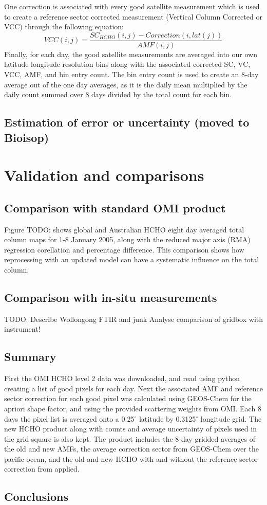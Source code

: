     One correction is associated with every good satellite measurement which is used to create a reference sector corrected measurement (Vertical Column Corrected or VCC) through the following equation:
    \begin{equation}
      VCC(i,j) = \frac{SC_{HCHO}(i,j) - Correction(i,lat(j))}{AMF(i,j)}
    \end{equation}
    Finally, for each day, the good satellite measurements are averaged into our own latitude longitude resolution bins along with the associated corrected SC, VC, VCC, AMF, and bin entry count.
    The bin entry count is used to create an 8-day average out of the one day averages, as it is the daily mean multiplied by the daily count summed over 8 days divided by the total count for each bin.
    
  \subsection{Estimation of error or uncertainty (moved to Bioisop)}
    
  
\section{Validation and comparisons}
  \label{ch_HCHO:sec:Validation}
  
  \subsection{Comparison with standard OMI product}
    Figure TODO: shows global and Australian HCHO eight day averaged total column maps for 1-8 January 2005, along with the reduced major axis (RMA) regression corellation and percentage difference.
   This comparison shows how reprocessing with an updated model can have a systematic influence on the total column.
  
  \subsection{Comparison with in-situ measurements}
    TODO: Describe Wollongong FTIR and junk
    Analyse comparison of gridbox with instrument!

  \subsection{Summary}
    First the OMI HCHO level 2 data was downloaded, and read using python creating a list of good pixels for each day.
    Next the associated AMF and reference sector correction for each good pixel was calculated using GEOS-Chem for the apriori shape factor, and using the provided scattering weights from OMI.
    Each 8 days the pixel list is averaged onto a 0.25$^{\circ}$ latitude by 0.3125$^{\circ}$ longitude grid.
    The new HCHO product along with counts and average uncertainty of pixels used in the grid square is also kept.
    The product includes the 8-day gridded averages of the old and new AMFs, the average correction sector from GEOS-Chem over the pacific ocean, and the old and new HCHO with and without the reference sector correction from \cite{Abad2015} applied.
    
    \subsection{Conclusions}
